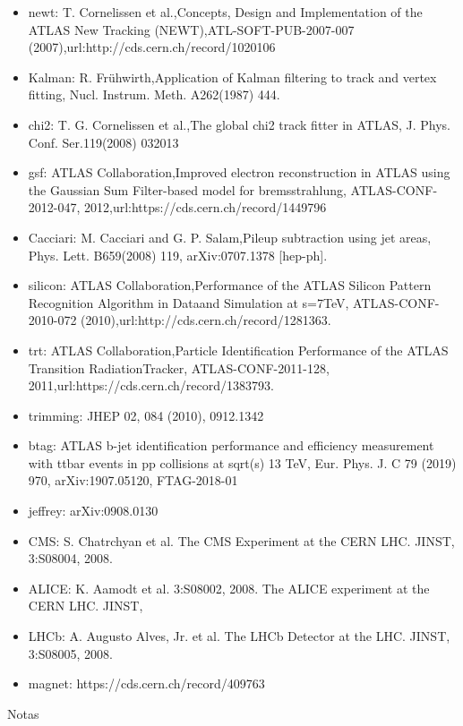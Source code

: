 \begin{itemize}
	\item newt: T. Cornelissen et al.,Concepts, Design and Implementation of the ATLAS New Tracking (NEWT),ATL-SOFT-PUB-2007-007 (2007),url:http://cds.cern.ch/record/1020106
	\item Kalman: R. Frühwirth,Application of Kalman filtering to track and vertex fitting, Nucl. Instrum. Meth. A262(1987) 444.
	\item chi2: T. G. Cornelissen et al.,The global chi2 track fitter in ATLAS, J. Phys. Conf. Ser.119(2008) 032013
	\item gsf: ATLAS Collaboration,Improved electron reconstruction in ATLAS using the Gaussian Sum Filter-based model for bremsstrahlung, ATLAS-CONF-2012-047, 2012,url:https://cds.cern.ch/record/1449796
	\item Cacciari: M. Cacciari and G. P. Salam,Pileup subtraction using jet areas, Phys. Lett. B659(2008) 119, arXiv:0707.1378 [hep-ph].
	\item silicon: ATLAS Collaboration,Performance of the ATLAS Silicon Pattern Recognition Algorithm in Dataand Simulation at s=7TeV, ATLAS-CONF-2010-072 (2010),url:http://cds.cern.ch/record/1281363.
	\item trt: ATLAS Collaboration,Particle Identification Performance of the ATLAS Transition RadiationTracker, ATLAS-CONF-2011-128, 2011,url:https://cds.cern.ch/record/1383793.
	\item trimming: JHEP 02, 084 (2010), 0912.1342
	\item btag:  ATLAS b-jet identification performance and efficiency measurement with ttbar events in pp collisions at sqrt(s) 13 TeV, Eur. Phys. J. C 79 (2019) 970, arXiv:1907.05120, FTAG-2018-01 
	\item jeffrey: arXiv:0908.0130
	\item CMS: S. Chatrchyan et al. The CMS Experiment at the CERN LHC. JINST, 3:S08004, 2008.
	\item ALICE: K. Aamodt et al. 3:S08002, 2008. The ALICE experiment at the CERN LHC. JINST,
	\item LHCb: A. Augusto Alves, Jr. et al. The LHCb Detector at the LHC. JINST, 3:S08005, 2008.
	\item magnet: https://cds.cern.ch/record/409763

\end{itemize}


\vspace{2cm}


{\LARGE Notas}

